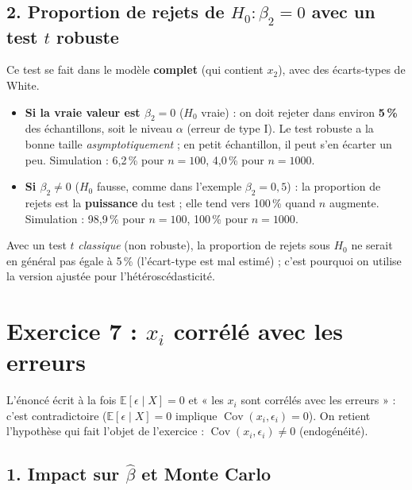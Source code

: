 \documentclass[11pt,a4paper]{article}
\newcommand{\E}{\mathbb{E}}\newcommand{\Var}{\operatorname{Var}}\newcommand{\Cov}{\operatorname{Cov}}
\begin{document}
\subsection*{2. Proportion de rejets de $H_0:\beta_2=0$ avec un test $t$ robuste}

Ce test se fait dans le modèle \textbf{complet} (qui contient $x_2$), avec des écarts-types de White.

\begin{reponse}
\begin{itemize}[nosep]
\item \textbf{Si la vraie valeur est $\beta_2=0$} ($H_0$ vraie) : on doit rejeter dans environ \textbf{5\,\%} des échantillons, soit le niveau $\alpha$ (erreur de type I). Le test robuste a la bonne taille \emph{asymptotiquement} ; en petit échantillon, il peut s'en écarter un peu. Simulation : 6,2\,\% pour $n=100$, 4,0\,\% pour $n=1000$.
\item \textbf{Si $\beta_2\neq0$} ($H_0$ fausse, comme dans l'exemple $\beta_2=0{,}5$) : la proportion de rejets est la \textbf{puissance} du test ; elle tend vers 100\,\% quand $n$ augmente. Simulation : 98,9\,\% pour $n=100$, 100\,\% pour $n=1000$.
\end{itemize}
Avec un test $t$ \emph{classique} (non robuste), la proportion de rejets sous $H_0$ ne serait en général pas égale à 5\,\% (l'écart-type est mal estimé) ; c'est pourquoi on utilise la version ajustée pour l'hétéroscédasticité.
\end{reponse}

\section{Exercice 7 : $x_i$ corrélé avec les erreurs}

\begin{attention}
L'énoncé écrit à la fois $\E[\epsilon\mid X]=0$ et « les $x_i$ sont corrélés avec les erreurs » : c'est contradictoire ($\E[\epsilon\mid X]=0$ implique $\Cov(x_i,\epsilon_i)=0$). On retient l'hypothèse qui fait l'objet de l'exercice : $\Cov(x_i,\epsilon_i)\neq0$ (endogénéité).
\end{attention}

\subsection*{1. Impact sur $\hat\beta$ et Monte Carlo}
\end{document}
